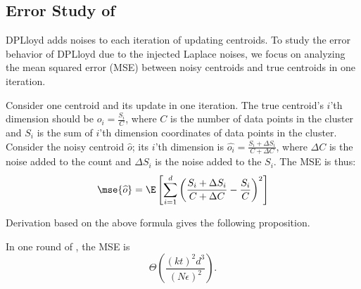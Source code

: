 \subsection{Error Study of \dpl}\label{sec:dpl_Analysis}

DPLloyd adds noises to each iteration of updating centroids.  To study the error behavior of DPLloyd due to the injected Laplace noises, we focus on analyzing the mean squared error (MSE) between noisy centroids and true centroids in one iteration.  


Consider one centroid and its update in one iteration.  The true centroid's $i$'th dimension should be $o_i=\frac{S_i}{C}$, where $C$ is the number of data points in the cluster and $S_i$ is the sum of $i$'th dimension coordinates of data points in the cluster.  Consider the noisy centroid $\widehat{o}$; its $i$'th dimension is $\widehat{o_i}=\frac{S_i+\Delta S_i}{C +\Delta C}$, where $\Delta C$ is the noise added to the count and $\Delta S_i$ is the noise added to the $S_i$.  The MSE is thus:
\begin{equation} \label{eq:DPLMSE}
\mse{\widehat{o}}  = \E\left[ \sum_{i=1}^{d} \left(\frac{S_i + \Delta S_i}{C + \Delta C} - \frac{S_i}{C}\right)^2 \right]
\end{equation}



Derivation based on the above formula gives the following proposition.

\begin{proposition}\label{thm:DPLMSE}
In one round of \dpl, the MSE is
\begin{equation*}\label{eqn:dpl_mse}
\Theta\left(\frac{(kt)^2d^3}{(N\epsilon)^2}\right).
\end{equation*}
\end{proposition}

